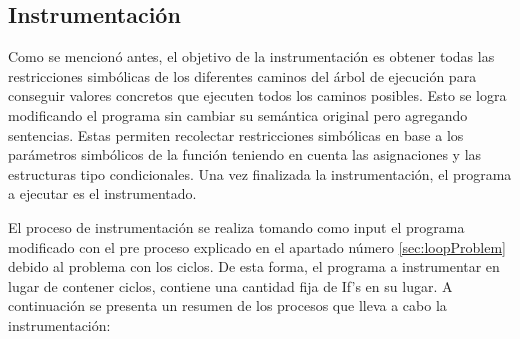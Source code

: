 \documentclass{llncs}
\begin{document}
\subsection{Instrumentación}
Como se mencionó antes, el objetivo de la instrumentación es obtener todas las restricciones simbólicas de los diferentes caminos del árbol de
ejecución para conseguir valores concretos que ejecuten todos los caminos posibles. Esto se logra modificando el programa sin cambiar su semántica original
pero agregando sentencias. Estas permiten recolectar restricciones simbólicas en base a los parámetros simbólicos de la función teniendo en cuenta las asignaciones
y las estructuras tipo condicionales. Una vez finalizada la instrumentación, el programa a ejecutar es el instrumentado.

El proceso de instrumentación se realiza tomando como input el programa modificado con el pre proceso explicado en el apartado número \ref{sec:loopProblem}
debido al problema con los ciclos. De esta forma, el programa a instrumentar en lugar de contener ciclos, contiene una cantidad fija de If’s en su lugar.
A continuación se presenta un resumen de los procesos que lleva a cabo la instrumentación:
\end{document}
